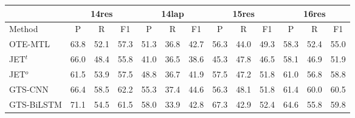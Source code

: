 \documentclass[11pt]{article}
\begin{document}
\begin{table*}
	\centering
	\begin{tabular}{|l|lll|lll|lll|lll|}
		\hline
		& \multicolumn{3}{c|}{14res}                                              & \multicolumn{3}{c|}{14lap}                                              & \multicolumn{3}{c|}{15res}                                              & \multicolumn{3}{c|}{16res}                                              \\ \hline
		Method          & \multicolumn{1}{c}{P} & \multicolumn{1}{c}{R} & \multicolumn{1}{c|}{F1} & \multicolumn{1}{c}{P} & \multicolumn{1}{c}{R} & \multicolumn{1}{c|}{F1} & \multicolumn{1}{c}{P} & \multicolumn{1}{c}{R} & \multicolumn{1}{c|}{F1} & \multicolumn{1}{c}{P} & \multicolumn{1}{c}{R} & \multicolumn{1}{c|}{F1} \\
		OTE-MTL         & 63.8                  & 52.1                  & 57.3                    & 51.3                  & 36.8                  & 42.7                    & 56.3                  & 44.0                  & 49.3                    & 58.3                  & 52.4                  & 55.0                    \\
		JET$^t$         & 66.0                  & 48.4                  & 55.8                    & 41.0                  & 36.5                  & 38.6                    & 45.3                  & 47.8                  & 46.5                    & 58.1                  & 46.9                  & 51.9                    \\
		JET$^o$         & 61.5                  & 53.9                  & 57.5                    & 48.8                  & 36.7                  & 41.9                    & 57.5                  & 47.2                  & 51.8                    & 61.0                  & 56.8                  & 58.8                    \\
		GTS-CNN         & 66.4                  & 58.5                  & 62.2                    & 55.3                  & 37.4                  & 44.6                    & 56.3                  & 48.1                  & 51.8                    & 61.4                  & 60.0                  & 60.5                    \\
		GTS-BiLSTM      & 71.1                  & 54.5                  & 61.5                    & 58.0                  & 33.9                  & 42.8                    & 67.3                  & 42.9                  & 52.4                    & 64.6                  & 55.8                  & 59.8                    \\

\end{tabular}
\end{table*}
\end{document}
